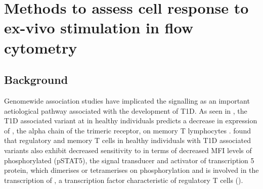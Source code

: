 \chapter{ \label{chapter:il2} Methods to assess cell response to ex-vivo stimulation in flow cytometry }


\section{Background}

Genomewide association studies have implicated the  signalling as an important aetiological pathway associated with the development of \gls{T1D}.  
As seen in , the T1D associated  variant at  in healthy individuals predicts a decrease in expression of ,
the alpha chain of the trimeric  receptor, on memory \positive T lymphocytes \citep{Dendrou:2008gc,Dendrou:2009dv}.
\citet{Garg:2012jr} found that regulatory and memory \positive T cells in healthy individuals with T1D associated  variants also
exhibit decreased sensitivity to  in terms of decreased MFI levels of phosphorylated  (pSTAT5),
the signal transducer and activator of transcription 5 protein, 
which dimerises or tetramerises on phosphorylation and is involved in the transcription
of , a transcription factor characteristic of regulatory T cells ().

